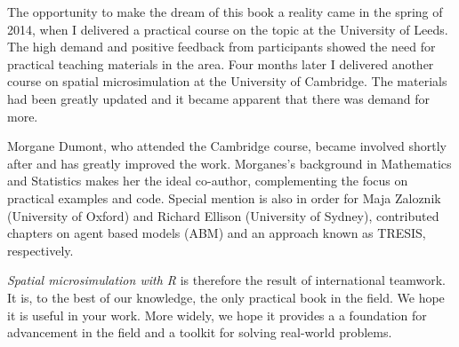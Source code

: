 The opportunity to make the dream of this book a reality came in the spring
of 2014, when I delivered a practical course on the topic at
the University of Leeds.
The high demand and positive feedback from participants
showed the need for practical teaching materials in the area.
Four months later
I delivered another course on spatial microsimulation
at the University of Cambridge.
The materials had been greatly updated
and it became apparent that there was demand for more.

Morgane Dumont, who attended the Cambridge course,
became involved shortly after and has greatly improved the work.
Morganes's background in Mathematics and Statistics makes her the
ideal co-author, complementing the focus on practical examples
and code. Special mention is also in order for Maja Zaloznik
(University of Oxford)
and Richard Ellison (University of Sydney),
contributed chapters on
agent based models (ABM) and an approach known as TRESIS, respectively.



\emph{Spatial microsimulation with R} is therefore the
result of international teamwork.
It is, to the best of our knowledge, the only practical book in the
field. We hope it is useful in your work.
More widely, we hope it provides a
a foundation for advancement in the
field and a toolkit for solving real-world problems.

